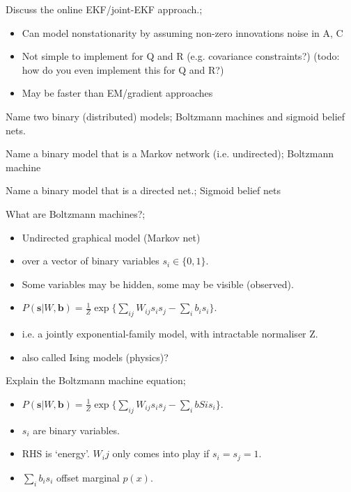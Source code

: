 \documentclass{article}
\begin{document}
Discuss the online EKF/joint-EKF approach.; \begin{itemize}
    \item Can model nonstationarity by assuming non-zero innovations noise in A, C
    \item Not simple to implement for Q and R (e.g. covariance constraints?) (todo: how do you even implement this for Q and R?)
    \item May be faster than EM/gradient approaches
\end{itemize}

Name two binary (distributed) models; Boltzmann machines and sigmoid belief nets.

Name a binary model that is a Markov network (i.e. undirected); Boltzmann machine

Name a binary model that is a directed net.; Sigmoid belief nets

What are Boltzmann machines?;\begin{itemize}
    \item Undirected graphical model (Markov net)
    \item over a vector of binary variables $s_i\in\{0, 1\}$.
    \item Some variables may be hidden, some may be visible (observed).
    \item $P(\mathbf{s}|W, \mathbf{b})=\frac{1}{Z}\exp\{\sum_{ij}W_{ij}s_is_j-\sum_ib_is_i\}$.
    \item i.e. a jointly exponential-family model, with intractable normaliser Z.
    \item also called Ising models (physics)?
\end{itemize} 

Explain the Boltzmann machine equation; \begin{itemize}
    \item $P(\mathbf{s}|W, \mathbf{b})=\frac{1}{Z}\exp\{\sum_{ij}W_{ij}s_is_j-\sum_ibSis_i\}$.
    \item $s_i$ are binary variables.
    \item RHS is `energy'. $W_ij$ only comes into play if $s_i=s_j=1$.
    \item $\sum_i b_is_i$ offset marginal $p(x)$.
\end{itemize}
\end{document}
